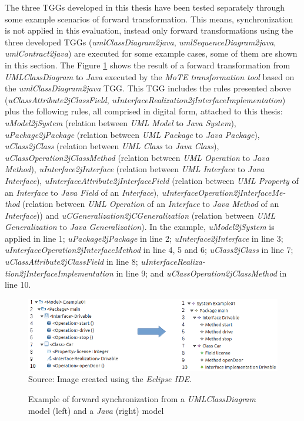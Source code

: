 \documentclass[tuberlin,cic,tc,english,noabntcite, oneside]{iiufrgs}
\begin{document}
The three TGGs developed in this thesis have been tested separately through some example scenarios of forward transformation. This means, synchronization is not applied in this evaluation, instead only forward transformations using the three developed TGGs (\emph{umlClassDiagram2java}, \emph{umlSequenceDiagram2java}, \emph{umlContract2java}) are executed for some example cases, some of them are shown in this section. The Figure \ref{fig:umlClassDiagram2java_Example01} shows the result of a forward transformation from \emph{UMLClassDiagram} to \emph{Java} executed by the \emph{MoTE transformation tool} based on the \emph{umlClassDiagram2java} TGG. This TGG includes the rules presented above (\emph{uClassAttribute2jClassField}, \emph{uInterfaceRealization2jInterfaceImplementation}) plus the following rules, all comprised in digital form, attached to this thesis: \emph{uModel2jSystem} (relation between \emph{UML Model} to \emph{Java System}), \emph{uPackage2jPackage} (relation between \emph{UML Package} to \emph{Java Package}), \emph{uClass2jClass} (relation between \emph{UML Class} to \emph{Java Class}), \emph{uClassOperation2jClassMethod} (relation between \emph{UML Operation} to \emph{Java Method}), \emph{uInterface2jInterface} (relation between \emph{UML Interface} to \emph{Java Interface}), \emph{uInterfaceAttribute2jInterfaceField} (relation between \emph{UML Property} of an \emph{Interface} to \emph{Java Field} of an \emph{Interface}), \emph{uInterfaceOperation2jInterfaceMe- thod} (relation between \emph{UML Operation} of an \emph{Interface} to \emph{Java Method} of an \emph{Interface})) and \emph{uCGeneralization2jCGeneralization} (relation between \emph{UML Generalization} to \emph{Java Generalization}). In the example, \emph{uModel2jSystem} is applied in line 1; \emph{uPackage2jPackage} in line 2; \emph{uInterface2jInterface} in line 3; \emph{uInterfaceOperation2jInterfaceMethod} in line 4, 5 and 6; \emph{uClass2jClass} in line 7; \emph{uClassAttribute2jClassField} in line 8;  \emph{uInterfaceRealiza- tion2jInterfaceImplementation} in line 9; and \emph{uClassOperation2jClassMethod} in line 10.

\begin{figure}[H]
	\centering
    \caption{Example of forward synchronization from a \emph{UMLClassDiagram} model (left) and a \emph{Java} (right) model}
    \includegraphics[width=.9\textwidth]{umlClassDiagram2java_Example01} \\
    Source: Image created using the \emph{Eclipse IDE}.
    \label{fig:umlClassDiagram2java_Example01}
\end{figure}
\end{document}
